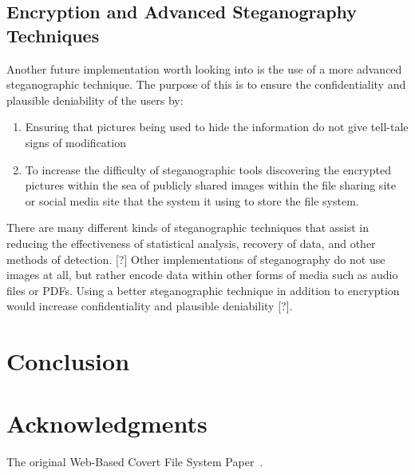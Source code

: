 \documentclass[12pt,journal,compsoc]{IEEEtran}
\begin{document}
\subsection{Encryption and Advanced Steganography Techniques}

Another future implementation worth looking into is the use of a more advanced steganographic technique. The purpose of this is to ensure the confidentiality and plausible deniability of the users by:
\begin{enumerate}
\item Ensuring that pictures being used to hide the information do not give tell-tale signs of modification
\item To increase the difficulty of steganographic tools discovering the encrypted pictures within the sea of publicly shared images within the file sharing site or social media site that the system it using to store the file system.
\end{enumerate}
There are many different kinds of steganographic techniques that assist in reducing the effectiveness of statistical analysis, recovery of data, and other methods of detection. [?] Other implementations of steganography do not use images at all, but rather encode data within other forms of media such as audio files or PDFs. Using a better steganographic technique in addition to encryption would increase confidentiality and plausible deniability [?]. %


\section{Conclusion}

\section{Acknowledgments}

The original Web-Based Covert File System Paper~\cite{Baliga2007}.


\end{document}
